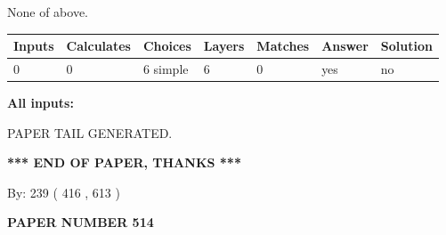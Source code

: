 \documentclass[12pt]{article}
\begin{document}
 
 None of above.
 
 
\noindent{}
 
 
   
   
   
   
\noindent\begin{tabular}{|l|l|l|l|l|l|l|}
 \hline
Inputs & Calculates & Choices & Layers & Matches & Answer & Solution \\ \hline
 0  & 
 0  & 
 6
  simple  
  & 
 6  & 
 0  & 
  yes & 
  no 
  \\ \hline
 \end{tabular}
   
   
   
   
\noindent{}
   
   
   
   
\noindent\vspace{0.1in}\hspace{-0.08in} {\textbf{\Large{All inputs: }}}
   
   
   
   
   
   
 \vspace{0.2in}
 
   
   
\vspace{2.0in} PAPER TAIL GENERATED.
   
   
   
   
\vspace{1.0in} 
{\textbf{\large{ *** END OF PAPER, THANKS *** }}} 
   
   
\hspace{1.0in} By: 
 239 ( 416 ,  613 )
   
   
   
   
\newpage 
\setcounter{page}{ 
   514001 } 
   
   
   
   
 {\textbf{ \Large{ PAPER NUMBER  514  }}}
   
   
\vspace{0.2in}
   
   
   
   
   
   
   
\end{document}
